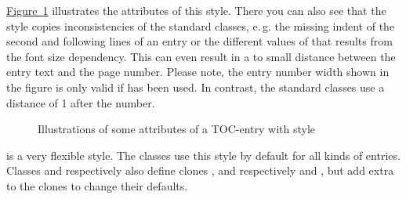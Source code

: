 \begin{description}
  \hyperref[fig:tocbasic.largetocline]%
  {Figure~\ref*{fig:tocbasic.largetocline}} illustrates the attributes of
  this style. There you can also see that the style copies inconsistencies of
  the standard classes, e.\,g. the missing indent of the second and following
  lines of an entry or the different values of  that results
  from the font size dependency. This can even result in a to small distance
  between the entry text and the page number. Please note, the entry number
  width shown in the figure is only valid if  has been
  used. In contrast, the standard classes use a distance of 1 after
  the number.
  \begin{figure}
    \centering
    \caption{Illustrations of some attributes of a TOC-entry with style 
      }
    \label{fig:tocbasic.largetocline}
  \end{figure}
\item[\PValue{tocline}] is a very flexible style. The \KOMAScript{} classes
  use this style by default for all kinds of entries. Classes 
  and  respectively  also define
  clones ,  and  respectively
   and , but add extra
   to the clones to change their defaults.


\end{description}
